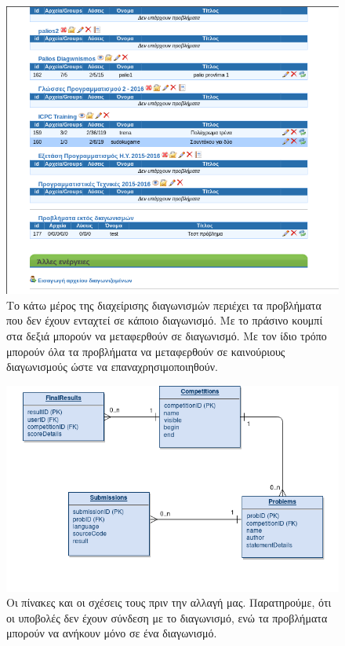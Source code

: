 \documentclass[diploma]{softlab-thesis}
\begin{document}
\begin{figure}
  \centering
  \includegraphics[scale=0.5,trim=4 4 4 4,clip]{Figures/beforesep.png}
  \caption[Προβλήματα εκτός διαγωνισμών]{Το κάτω μέρος της διαχείρισης
  διαγωνισμών περιέχει τα προβλήματα που δεν έχουν ενταχτεί σε κάποιο
  διαγωνισμό. Με το πράσινο κουμπί στα δεξιά μπορούν να μεταφερθούν σε
  διαγωνισμό. Με τον ίδιο τρόπο μπορούν όλα τα προβλήματα να μεταφερθούν σε
  καινούριους διαγωνισμούς ώστε να επαναχρησιμοποιηθούν.}
\end{figure}

\bigskip

\begin{figure}
  \centering
  \includegraphics[scale=0.5,trim=4 4 4 4,clip]{Figures/sepbefore.png}
  \caption[Βάση πριν το διαχωρισμό]{Οι πίνακες και οι σχέσεις τους πριν την
  αλλαγή μας. Παρατηρούμε, ότι οι υποβολές δεν έχουν σύνδεση με το διαγωνισμό,
  ενώ τα προβλήματα μπορούν να ανήκουν μόνο σε ένα διαγωνισμό.}
\end{figure}
\end{document}
